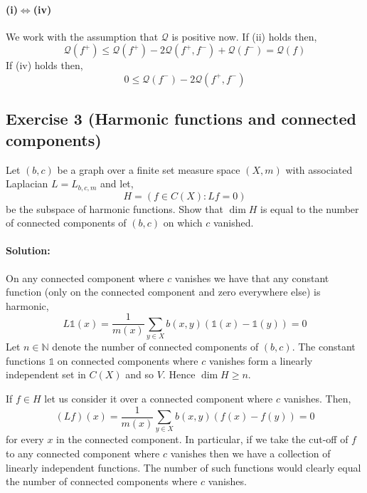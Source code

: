 \paragraph{(i)$\iff$(iv)}
We work with the assumption that $\mathcal{Q}$ is positive now. If (ii) holds then,
\begin{equation*}
	\mathcal{Q}(f^{+}) \leq \mathcal{Q}(f^{+}) - 2\mathcal{Q}(f^{+},f^{-}) + \mathcal{Q}(f^{-}) = \mathcal{Q}(f)
\end{equation*}
If (iv) holds then,
\begin{equation*}
	0 \leq \mathcal{Q}(f^{-}) - 2\mathcal{Q}(f^{+},f^{-})
\end{equation*}

\subsection{Exercise 3 (Harmonic functions and connected components)}
Let $(b,c)$ be a graph over a finite set measure space $(X,m)$ with associated Laplacian $L=L_{b,c,m}$ and let,
\begin{equation*}
	H = \left(f\in C(X)\colon Lf = 0\right)
\end{equation*}
be the subspace of harmonic functions. Show that $\dim H$ is equal to the number of connected components of $(b,c)$ on which $c$ vanished.

\paragraph{Solution:}
On any connected component where $c$ vanishes we have that any constant function (only on the connected component and zero everywhere else) is harmonic,
\begin{equation*}
	L\mathds{1}(x) = \frac{1}{m(x)}\sum_{y\in X}b(x,y)(\mathds{1}(x) - \mathds{1}(y)) = 0
\end{equation*}
Let $n\in\mathbb{N}$ denote the number of connected components of $(b,c)$. The constant functions $\mathds{1}$ on connected components where $c$ vanishes form a linearly independent set in $C(X)$ and so $V$. Hence $\dim H \geq n$.

If $f\in H$ let us consider it over a connected component where $c$ vanishes. Then,
\begin{equation*}
	(Lf)(x) = \frac{1}{m(x)}\sum_{y\in X} b(x,y)(f(x) - f(y)) = 0
\end{equation*}
for every $x$ in the connected component. In particular, if we take the cut-off of $f$ to any connected component where $c$ vanishes then we have a collection of linearly independent functions. The number of such functions would clearly equal the number of connected components where $c$ vanishes.

